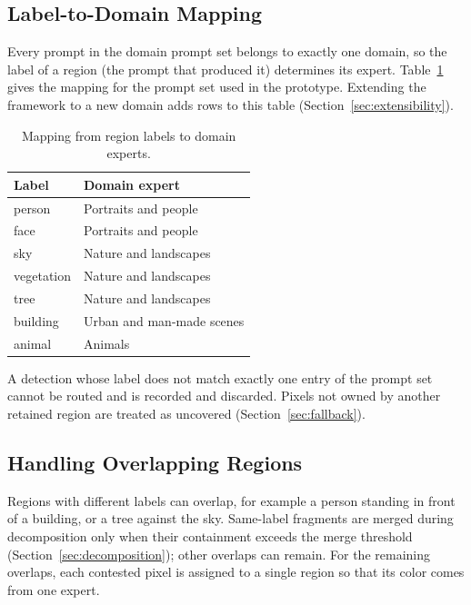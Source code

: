 \documentclass{FastFyp}
\begin{document}
\subsection{Label-to-Domain Mapping}

Every prompt in the domain prompt set belongs to exactly one domain, so the label of a region (the prompt that produced it) determines its expert. Table~\ref{tab:routing} gives the mapping for the prompt set used in the prototype. Extending the framework to a new domain adds rows to this table (Section~\ref{sec:extensibility}).

\begin{table}[htbp]
    \centering
    \renewcommand{\arraystretch}{1.3}
    \caption{Mapping from region labels to domain experts.}
    \label{tab:routing}
    \begin{tabular}{|p{3.5cm}|p{6cm}|}
        \hline
        \textbf{Label} & \textbf{Domain expert} \\
        \hline
        person & Portraits and people \\
        \hline
        face & Portraits and people \\
        \hline
        sky & Nature and landscapes \\
        \hline
        vegetation & Nature and landscapes \\
        \hline
        tree & Nature and landscapes \\
        \hline
        building & Urban and man-made scenes \\
        \hline
        animal & Animals \\
        \hline
    \end{tabular}
\end{table}

A detection whose label does not match exactly one entry of the prompt set cannot be routed and is recorded and discarded. Pixels not owned by another retained region are treated as uncovered (Section~\ref{sec:fallback}).

\subsection{Handling Overlapping Regions}
\label{sec:overlap}

Regions with different labels can overlap, for example a person standing in front of a building, or a tree against the sky. Same-label fragments are merged during decomposition only when their containment exceeds the merge threshold (Section~\ref{sec:decomposition}); other overlaps can remain. For the remaining overlaps, each contested pixel is assigned to a single region so that its color comes from one expert.
\end{document}
